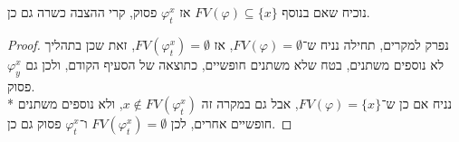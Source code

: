 \subquestion{}
נוכיח שאם בנוסף $FV(\varphi) \subseteq \{x\}$ אז $\varphi_t^x$ פסוק, קרי ההצבה כשרה גם כן.
\begin{proof}
	נפרק למקרים, תחילה נניח ש־$FV(\varphi) = \emptyset$, אז $FV(\varphi_t^x) = \emptyset$, זאת שכן בתהליך לא נוספים משתנים, בטח שלא משתנים חופשיים, כתוצאה של הסעיף הקודם, ולכן גם $\varphi_y^x$ פסוק. \\*
	נניח אם כן ש־$FV(\varphi) = \{x\}$, אבל גם במקרה זה $x \notin FV(\varphi_t^x)$, ולא נוספים משתנים חופשיים אחרים, לכן $FV(\varphi_t^x) = \emptyset$ ו־$\varphi_t^x$ פסוק גם כן.
\end{proof}


